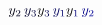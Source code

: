 \documentclass[12pt]{article}
\begin{document}
\makeatletter
\renewcommand*{\@textcolor}[3]{%
  \protect\leavevmode
  \begingroup
    \color#1{#2}#3%
  \endgroup
}
\makeatother
\begin{displaymath}
\mathcolor[RGB]{0,0,15}{y} _ { \mathcolor[RGB]{0,0,30}{2} } \, \mathcolor[RGB]{0,0,45}{y} _ { \mathcolor[RGB]{0,0,60}{3} }

y _ { \mathcolor[RGB]{0,0,75}{3} } \, \mathcolor[RGB]{0,0,90}{y} _ { \mathcolor[RGB]{0,0,105}{1} }

y _ { \mathcolor[RGB]{0,0,120}{1} } \, \mathcolor[RGB]{0,0,135}{y} _ { \mathcolor[RGB]{0,0,150}{2} }
\end{displaymath}
\end{document}
